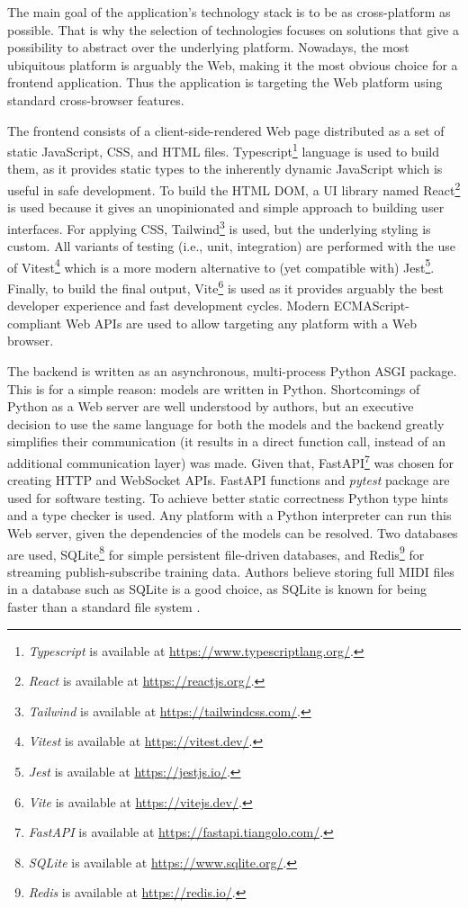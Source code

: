 \documentclass[a4paper, 11pt, twoside]{report}
\theoremstyle{definition}
\begin{document}
The main goal of the application's technology stack is to be as cross-platform as possible. That is why the selection of technologies focuses on solutions that give a possibility to abstract over the underlying platform. Nowadays, the most ubiquitous platform is arguably the Web, making it the most obvious choice for a frontend application. Thus the application is targeting the Web platform using standard cross-browser features. \par
The frontend consists of a client-side-rendered Web page distributed as a set of static JavaScript, CSS, and HTML files. Typescript\footnote{\textit{Typescript} is available at \url{https://www.typescriptlang.org/}.} language is used to build them, as it provides static types to the inherently dynamic JavaScript which is useful in safe development. To build the HTML DOM, a UI library named React\footnote{\textit{React} is available at \url{https://reactjs.org/}.} is used because it gives an unopinionated and simple approach to building user interfaces. For applying CSS, Tailwind\footnote{\textit{Tailwind} is available at \url{https://tailwindcss.com/}.} is used, but the underlying styling is custom. All variants of testing (i.e., unit, integration) are performed with the use of Vitest\footnote{\textit{Vitest} is available at \url{https://vitest.dev/}.} which is a more modern alternative to (yet compatible with) Jest\footnote{\textit{Jest} is available at \url{https://jestjs.io/}.}. Finally, to build the final output, Vite\footnote{\textit{Vite} is available at \url{https://vitejs.dev/}.} is used as it provides arguably the best developer experience and fast development cycles. Modern ECMAScript-compliant Web APIs are used to allow targeting any platform with a Web browser. \par
The backend is written as an asynchronous, multi-process Python ASGI package. This is for a simple reason: models are written in Python. Shortcomings of Python as a Web server are well understood by authors, but an executive decision to use the same language for both the models and the backend greatly simplifies their communication (it results in a direct function call, instead of an additional communication layer) was made. Given that, FastAPI\footnote{\textit{FastAPI} is available at \url{https://fastapi.tiangolo.com/}.} was chosen for creating HTTP and WebSocket APIs. FastAPI functions and \textit{pytest} package are used for software testing. To achieve better static correctness Python type hints and a type checker is used. Any platform with a Python interpreter can run this Web server, given the dependencies of the models can be resolved. Two databases are used, SQLite\footnote{\textit{SQLite} is available at \url{https://www.sqlite.org/}.} for simple persistent file-driven databases, and Redis\footnote{\textit{Redis} is available at \url{https://redis.io/}.} for streaming publish-subscribe training data. Authors believe storing full MIDI files in a database such as SQLite is a good choice, as SQLite is known for being faster than a standard file system \cite{sqlite_fs}. \par
\end{document}
